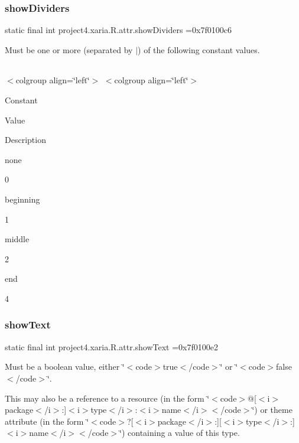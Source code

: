 \subsubsection{\texorpdfstring{show\+Dividers}{showDividers}}
{\footnotesize\ttfamily static final int project4.\+xaria.\+R.\+attr.\+show\+Dividers =0x7f0100c6\hspace{0.3cm}{\ttfamily [static]}}

Must be one or more (separated by \textquotesingle{}$\vert$\textquotesingle{}) of the following constant values.

\tabulinesep=1mm
\begin{longtabu} spread 0pt [c]{*{0}{|X[-1]}|}
\hline
\end{longtabu}
$<$colgroup align=\char`\"{}left\char`\"{}$>$ $<$colgroup align=\char`\"{}left\char`\"{}$>$ 

Constant

Value

Description 

{\ttfamily none}

0

{\ttfamily beginning}

1

{\ttfamily middle}

2

{\ttfamily end}

4\mbox{\label{classproject4_1_1xaria_1_1R_1_1attr_ab469c11f55b52f5819bffa3e4fb0df36}} 
\subsubsection{\texorpdfstring{show\+Text}{showText}}
{\footnotesize\ttfamily static final int project4.\+xaria.\+R.\+attr.\+show\+Text =0x7f0100e2\hspace{0.3cm}{\ttfamily [static]}}

Must be a boolean value, either \char`\"{}$<$code$>$true$<$/code$>$\char`\"{} or \char`\"{}$<$code$>$false$<$/code$>$\char`\"{}. 

This may also be a reference to a resource (in the form \char`\"{}$<$code$>$@\mbox{[}$<$i$>$package$<$/i$>$\+:\mbox{]}$<$i$>$type$<$/i$>$\+:$<$i$>$name$<$/i$>$$<$/code$>$\char`\"{}) or theme attribute (in the form \char`\"{}$<$code$>$?\mbox{[}$<$i$>$package$<$/i$>$\+:\mbox{]}\mbox{[}$<$i$>$type$<$/i$>$\+:\mbox{]}$<$i$>$name$<$/i$>$$<$/code$>$\char`\"{}) containing a value of this type. \mbox{\label{classproject4_1_1xaria_1_1R_1_1attr_a762cfc65f19982d1f352aa0de4487a44}} 
